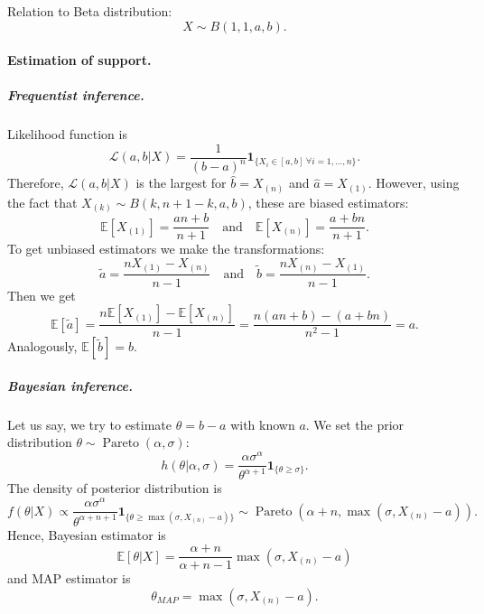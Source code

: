 \documentclass[a4paper,11pt]{article}
\theoremstyle{plain}
\theoremstyle{definition}
\newcommand{\ME}{\mathbb{E}}
\begin{document}
	Relation to Beta distribution: \[X \sim B(1, 1, a, b). \]
	\paragraph{Estimation of support.}
	\subparagraph{Frequentist inference.} Likelihood function is
	\[
	\mathcal{L}(a, b | X) = \frac{1}{(b-a)^n} \mathbf{1}_{ \{ X_i \in [a, b] \ \forall i = 1, \dots, n \} }.
	\]
	Therefore, $\mathcal{L}(a, b | X)$ is the largest for $\hat{b} = X_{(n)}$ and $\hat{a} = X_{(1)}$. However, using the fact that $X_{(k)} \sim B(k, n+1-k, a, b)$, these are biased estimators:
	\[ \ME[X_{(1)}] = \frac{an + b}{n+1} \quad \text{and} \quad \ME[X_{(n)}] = \frac{a + bn}{n+1}.  \]
	To get unbiased estimators we make the transformations:
	\[ \tilde{a} = \frac{nX_{(1)} - X_{(n)} }{n-1} \quad \text{and} \quad  \tilde{b} = \frac{nX_{(n)} - X_{(1)} }{n-1}. \]
	Then we get
	\[ 
	\ME[\tilde{a}] = \frac{n\ME[X_{(1)}] - \ME[X_{(n)}]}{n-1} = \frac{n(an+b)-(a+bn)}{n^2-1} = a.
	\]
	Analogously, $\ME[\tilde{b}] = b$.
	\subparagraph{Bayesian inference.} Let us say, we try to estimate $\theta = b-a$ with known $a$. We set the prior distribution $\theta \sim \operatorname{Pareto}(\alpha, \sigma)$:
	\[
	h(\theta|\alpha, \sigma) = \frac{\alpha \sigma^\alpha}{\theta^{\alpha + 1}} \mathbf{1}_{\{\theta \geq \sigma\}}.
	\]
	The density of posterior distribution is
	\[
	f(\theta|X) \propto \frac{\alpha \sigma^\alpha}{\theta^{\alpha+n+1}} \mathbf{1}_{\{\theta \geq \max(\sigma, X_{(n)}-a) \}} \sim \operatorname{Pareto}(\alpha + n, \max(\sigma, X_{(n)}-a) ).
	\]
	Hence, Bayesian estimator is
	\[  
	\ME[\theta|X] = \frac{\alpha + n}{\alpha + n - 1}\max(\sigma, X_{(n)}-a)
	\]
	and MAP estimator is
	\[
	\theta_{MAP} = \max(\sigma, X_{(n)}-a).
	\]
	
	\pagebreak
\end{document}
